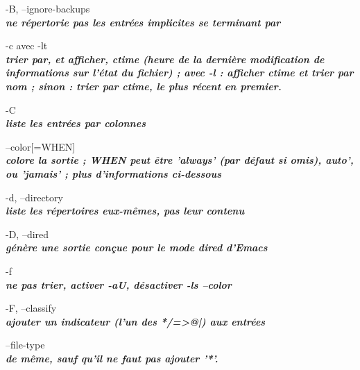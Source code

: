 \documentclass{article}
\begin{document}
      \par -B, --ignore-backups\\
               \textit{\textbf{ne répertorie pas les entrées implicites se terminant par ~}}\\

      \par -c avec -lt \\
		  \textit{\textbf{trier par, et afficher, ctime (heure de la dernière modification de
              informations sur l'état du fichier) ; avec -l : afficher ctime et trier par nom ;
              sinon : trier par ctime, le plus récent en premier.}}\\

       \par-C \\
	 \textit{\textbf{liste les entrées par colonnes}}\\


       \par --color[=WHEN] \\
               \textit{\textbf{colore la sortie ; WHEN peut être 'always' (par défaut si omis),
              auto', ou 'jamais' ; plus d'informations ci-dessous}}\\

       \par-d, --directory\\
              \textit{\textbf{liste les répertoires eux-mêmes, pas leur contenu}}\\

      \par -D, --dired\\
              \textit{\textbf{génère une sortie conçue pour le mode dired d'Emacs}}\\

       \par-f \\
		 \textit{\textbf{ne pas trier, activer -aU, désactiver -ls --color}}\\

       \par -F, --classify\\
               \textit{\textbf{ajouter un indicateur (l'un des */=>@|) aux entrées}}\\

      \par --file-type\\
              \textit{\textbf{de même, sauf qu'il ne faut pas ajouter '*'.}}\\
\end{document}
